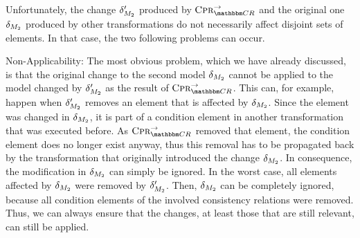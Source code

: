 Unfortunately, the change $\change{\metamodel{M}{2}}'$ produced by $\consistencypreservationrule{\consistencyrelationset{CR}}^{\rightarrow}$ and the original one $\change{\metamodel{M}{2}}$ produced by other transformations do not necessarily affect disjoint sets of elements.
In that case, the two following problems can occur.
\begin{properdescription}
    \item[Non-Applicability:] The most obvious problem, which we have already discussed, is that the original change to the second model $\change{\metamodel{M}{2}}$ cannot be applied to the model changed by $\change{\metamodel{M}{2}}'$ as the result of $\consistencypreservationrule{\consistencyrelationset{CR}}^{\rightarrow}$. 
    This can, for example, happen when $\change{\metamodel{M}{2}}'$ removes an element that is affected by $\change{\metamodel{M}{2}}$.
    Since the element was changed in $\change{\metamodel{M}{2}}$, it is part of a condition element in another transformation that was executed before.
    As $\consistencypreservationrule{\consistencyrelationset{CR}}^{\rightarrow}$ removed that element, the condition element does no longer exist anyway, thus this removal has to be propagated back by the transformation that originally introduced the change $\change{\metamodel{M}{2}}$.
    In consequence, the modification in $\change{\metamodel{M}{2}}$ can simply be ignored.
    In the worst case, all elements affected by $\change{\metamodel{M}{2}}$ were removed by $\change{\metamodel{M}{2}}'$.
    Then, $\change{\metamodel{M}{2}}$ can be completely ignored, because all condition elements of the involved consistency relations were removed.
    Thus, we can always ensure that the changes, at least those that are still relevant, can still be applied.
    

\end{properdescription}
